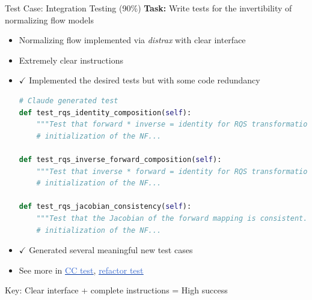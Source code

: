 \documentclass[aspectratio=169]{beamer}
\newcommand{\styhref}[2]{\href{#1}{\textcolor{highlight}{\underline{#2}}}}
\begin{document}
\begin{frame}[fragile]{Test Case: Integration Testing (90\%)}
	\textbf{Task:} Write tests for the invertibility of normalizing flow models

	\begin{itemize}
		\item Normalizing flow implemented via \textit{distrax} with clear interface
		\item Extremely clear instructions
		\item $\checkmark$ Implemented the desired tests but with some code redundancy
		\begin{lstlisting}[language=python]
# Claude generated test
def test_rqs_identity_composition(self):
    """Test that forward * inverse = identity for RQS transformation."""
    # initialization of the NF...

def test_rqs_inverse_forward_composition(self):
    """Test that inverse * forward = identity for RQS transformation."""
    # initialization of the NF...

def test_rqs_jacobian_consistency(self):
    """Test that the Jacobian of the forward mapping is consistent."""
    # initialization of the NF...
\end{lstlisting}
		\item $\checkmark$ Generated several meaningful new test cases
		\item See more in \styhref{https://github.com/jiaxi98/cnf\_ot/commit/c993a744042e0e4e4593c40b24b8b898c1a0688c}{CC test},
		\styhref{https://github.com/jiaxi98/cnf\_ot/commit/064a69bd308613d9c93d34b637a445601387acb4}{refactor test}
	\end{itemize}
	
	{\color{highlight}Key: Clear interface + complete instructions = High success}
\end{frame}
\end{document}
